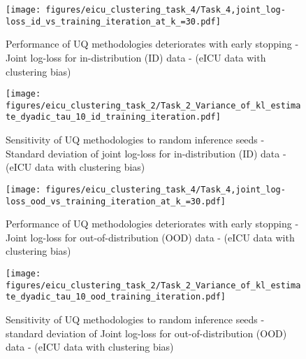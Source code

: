 


  
\begin{figure}[h]
\centering
\begin{minipage}[b]{0.40\textwidth}
\centering
\texttt{[image: figures/eicu\_clustering\_task\_4/Task\_4,joint\_log-loss\_id\_vs\_training\_iteration\_at\_k\_=30.pdf]}
\caption{Performance of UQ methodologies deteriorates with early stopping - Joint log-loss for in-distribution (ID) data - (eICU data with clustering bias)}
\label{fig:eicu-clustering-task-4-k-0}
\end{minipage}
\hfill
\begin{minipage}[b]{0.40\textwidth}
\centering
\texttt{[image: figures/eicu\_clustering\_task\_2/Task\_2\_Variance\_of\_kl\_estimate\_dyadic\_tau\_10\_id\_training\_iteration.pdf]}
\caption{Sensitivity of UQ methodologies to random inference seeds - Standard deviation of joint log-loss for in-distribution (ID) data - (eICU data with clustering bias)}
\label{fig:eicu-clustering-task-2-tau10-id}
\end{minipage}
\end{figure} 


\begin{figure}[h]
\centering
\begin{minipage}[b]{0.40\textwidth}
\centering
\texttt{[image: figures/eicu\_clustering\_task\_4/Task\_4,joint\_log-loss\_ood\_vs\_training\_iteration\_at\_k\_=30.pdf]}
\caption{Performance of UQ methodologies deteriorates with early stopping - Joint log-loss for out-of-distribution (OOD) data  - (eICU data with clustering bias)}
\label{fig:eicu-clustering-task-4-k-0-ood}
\end{minipage}
\hfill
\begin{minipage}[b]{0.40\textwidth}
\centering \texttt{[image: figures/eicu\_clustering\_task\_2/Task\_2\_Variance\_of\_kl\_estimate\_dyadic\_tau\_10\_ood\_training\_iteration.pdf]}
\caption{Sensitivity of UQ methodologies to random inference seeds - standard deviation of Joint log-loss for out-of-distribution (OOD) data - (eICU data with clustering bias)}
\label{fig:eicu-clustering-task-2-tau10-ood}
\end{minipage}
\end{figure} 

